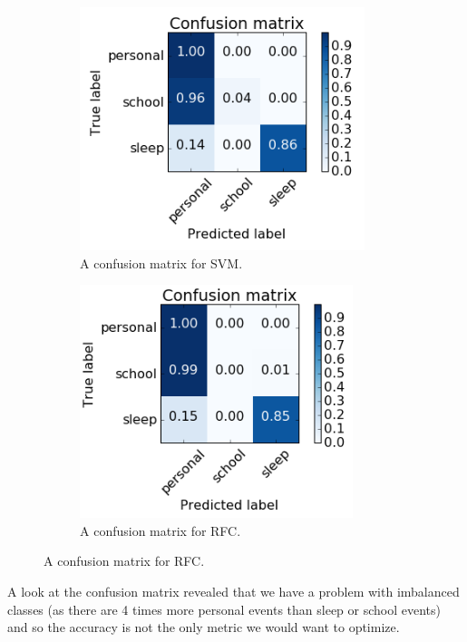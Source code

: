 \documentclass[a4paper, 12pt]{article}
\begin{document}
\begin{figure}[h!]
\centering
\begin{subfigure}{.5\textwidth}
  \centering
  \includegraphics[width=0.8\linewidth]{3class-cm-svm.png}
  \caption{A confusion matrix for SVM.}
\end{subfigure}%
\begin{subfigure}{.5\textwidth}
  \centering
  \includegraphics[width=0.8\linewidth]{3class-cm-rfc.png}
  \caption{A confusion matrix for RFC.}
\end{subfigure}
\end{figure}

A look at the confusion matrix revealed that we have a problem with
imbalanced classes (as there are 4 times more personal events than sleep or school
events) and so the accuracy is not the only metric we would want to optimize.
\end{document}
